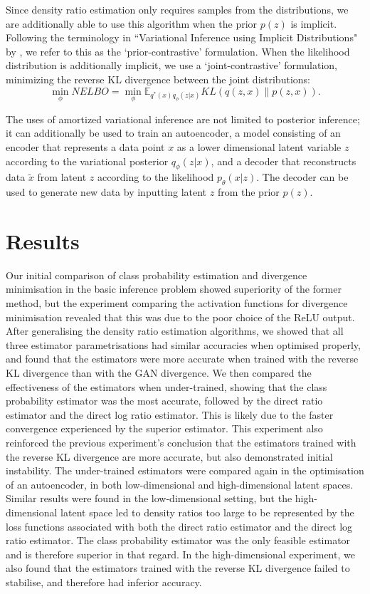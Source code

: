 \documentclass[honours,12pt]{unswthesis}
\newcommand{\E}{\mathbb{E}}
\numberwithin{equation}{section}
\theoremstyle{definition}
\begin{document}
Since density ratio estimation only requires samples from the distributions, we are additionally able to use this algorithm when the prior $p(z)$ is implicit. Following the terminology in ``Variational Inference using Implicit Distributions" by \citet{huszar}, we refer to this as the `prior-contrastive' formulation. When the likelihood distribution is additionally implicit, we use a `joint-contrastive' formulation, minimizing the reverse KL divergence between the joint distributions:
\[\min_\phi NELBO = \min_\phi \E_{q^*(x)q_\phi(z|x)}KL(q(z,x)\|p(z,x)).\]

The uses of amortized variational inference are not limited to posterior inference; it can additionally be used to train an autoencoder, a model consisting of an encoder that represents a data point $x$ as a lower dimensional latent variable $z$ according to the variational posterior $q_\phi(z|x)$, and a decoder that reconstructs data $\tilde{x}$ from latent $z$ according to the likelihood $p_\theta(x|z)$. The decoder can be used to generate new data by inputting latent $z$ from the prior $p(z)$.
\section{Results}
Our initial comparison of class probability estimation and divergence minimisation in the basic inference problem showed superiority of the former method, but the experiment comparing the activation functions for divergence minimisation revealed that this was due to the poor choice of the ReLU output. After generalising the density ratio estimation algorithms, we showed that all three estimator parametrisations had similar accuracies when optimised properly, and found that the estimators were more accurate when trained with the reverse KL divergence than with the GAN divergence. We then compared the effectiveness of the estimators when under-trained, showing that the class probability estimator was the most accurate, followed by the direct ratio estimator and the direct log ratio estimator. This is likely due to the faster convergence experienced by the superior estimator. This experiment also reinforced the previous experiment's conclusion that the estimators trained with the reverse KL divergence are more accurate, but also demonstrated initial instability. The under-trained estimators were compared again in the optimisation of an autoencoder, in both low-dimensional and high-dimensional latent spaces. Similar results were found in the low-dimensional setting, but the high-dimensional latent space led to density ratios too large to be represented by the loss functions associated with both the direct ratio estimator and the direct log ratio estimator. The class probability estimator was the only feasible estimator and is therefore superior in that regard. In the high-dimensional experiment, we also found that the estimators trained with the reverse KL divergence failed to stabilise, and therefore had inferior accuracy.
\end{document}
